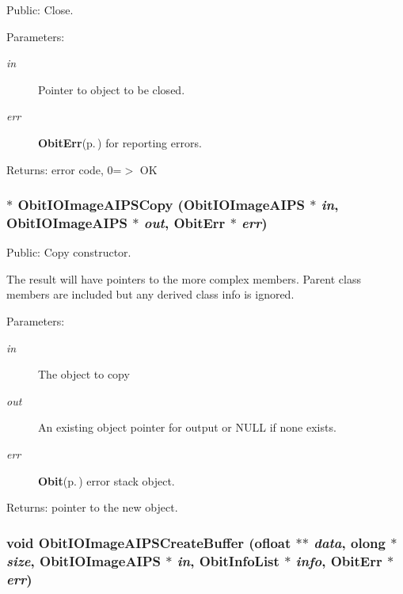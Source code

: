 Public: Close. 

\begin{Desc}
\item[Parameters:]
\begin{description}
\item[{\em in}]Pointer to object to be closed. \item[{\em err}]{\bf Obit\-Err}{\rm (p.\,\pageref{structObitErr})} for reporting errors. \end{description}
\end{Desc}
\begin{Desc}
\item[Returns:]error code, 0=$>$ OK \end{Desc}
\subsubsection{$\ast$ Obit\-IOImage\-AIPSCopy ({\bf Obit\-IOImage\-AIPS} $\ast$ {\em in}, {\bf Obit\-IOImage\-AIPS} $\ast$ {\em out}, {\bf Obit\-Err} $\ast$ {\em err})}\label{ObitIOImageAIPS_8h_a9}


Public: Copy constructor. 

The result will have pointers to the more complex members. Parent class members are included but any derived class info is ignored. \begin{Desc}
\item[Parameters:]
\begin{description}
\item[{\em in}]The object to copy \item[{\em out}]An existing object pointer for output or NULL if none exists. \item[{\em err}]{\bf Obit}{\rm (p.\,\pageref{structObit})} error stack object. \end{description}
\end{Desc}
\begin{Desc}
\item[Returns:]pointer to the new object. \end{Desc}
\subsubsection{\setlength{\rightskip}{0pt plus 5cm}void Obit\-IOImage\-AIPSCreate\-Buffer ({\bf ofloat} $\ast$$\ast$ {\em data}, {\bf olong} $\ast$ {\em size}, {\bf Obit\-IOImage\-AIPS} $\ast$ {\em in}, {\bf Obit\-Info\-List} $\ast$ {\em info}, {\bf Obit\-Err} $\ast$ {\em err})}\label{ObitIOImageAIPS_8h_a18}


